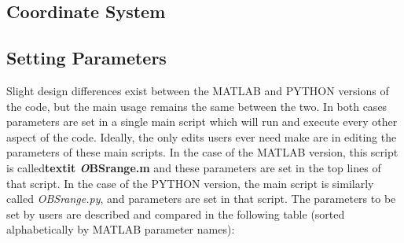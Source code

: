 \documentclass[titlepage]{article}
\begin{document}
  \subsection{Coordinate System}
  
  \subsection{Setting Parameters}
  Slight design differences exist between the MATLAB and PYTHON versions of the code, but the main usage remains the same between the two. In both cases parameters are set in a single main script which will run and execute every other aspect of the code. Ideally, the only edits users ever need make are in editing the parameters of these main scripts. In the case of the MATLAB version, this script is called\textbf{textit{ \textit{O}}BSrange.m} and these parameters are set in the top lines of that script. In the case of the PYTHON version, the main script is similarly called \textit{OBSrange.py}, and parameters are set in that script. The parameters to be set by users are described and compared in the following table (sorted alphabetically by MATLAB parameter names):
\end{document}
